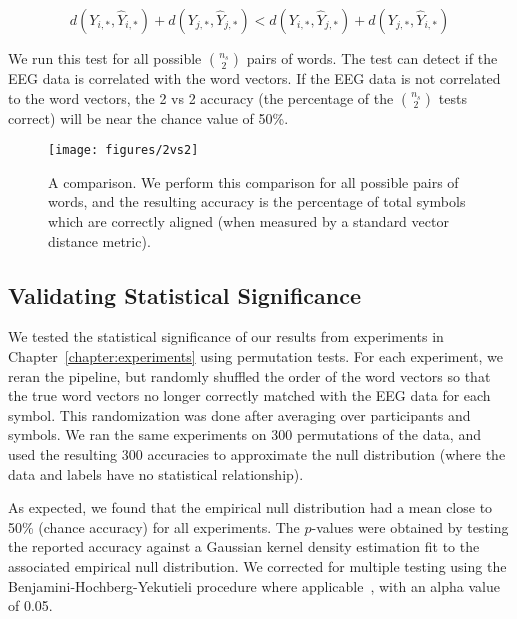 \begin{equation}
  d(Y_{i,*}, \hat{Y}_{i,*}) + d(Y_{j,*}, \hat{Y}_{j,*}) < 
  d(Y_{i,*}, \hat{Y}_{j,*}) + d(Y_{j,*}, \hat{Y}_{i,*})
  \label{eq:2vs2}
\end{equation}
  
\noindent We run this test for all possible ${\binom{n_s}{2}}$ pairs of words. 
The \tvt test can detect if the EEG data is correlated with the word vectors. 
If the EEG data is not correlated to the word vectors, the 2 vs 2 accuracy (the 
percentage of the ${\binom{n_s}{2}}$ \tvt tests correct) will be  near the 
chance value of 50\%.

\begin{figure}[t]
  \centering
  \texttt{[image: figures/2vs2]}
  \caption[The \tvt Comparison]{
    A \tvt comparison. We perform this comparison for all possible pairs of 
    words, and the resulting \tvt accuracy is the percentage of total symbols 
    which are correctly aligned (when measured by a standard vector distance 
    metric).
  }
  \label{fig:2vs2}
\end{figure}

\subsection{Validating Statistical Significance}
We tested the statistical significance of our results from experiments in 
Chapter~\ref{chapter:experiments} using permutation tests. For each experiment, 
we reran the pipeline, but randomly shuffled the order of the word vectors so 
that the true word vectors no longer correctly matched with the EEG data for 
each symbol. This randomization was done after averaging over participants and 
symbols. We ran the same experiments on 300 permutations of the data, and used 
the resulting 300 \tvt accuracies to approximate the null distribution (where 
the data and labels have no statistical relationship). 
  
As expected, we found that the empirical null distribution had a mean close to 
50\% (chance accuracy) for all experiments. The $p$-values were obtained by 
testing the reported accuracy against a Gaussian kernel density estimation fit 
to the associated empirical null distribution. We corrected for multiple 
testing using the Benjamini-Hochberg-Yekutieli procedure where 
applicable~\cite{benjamini2001control}, with an alpha value of 0.05.
